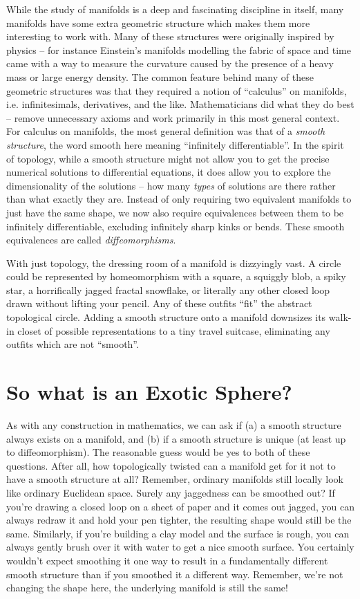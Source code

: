 While the study of manifolds is a deep and fascinating discipline in itself, many manifolds have some extra geometric structure which makes them more interesting to work with. Many of these structures were originally inspired by physics -- for instance Einstein's manifolds modelling the fabric of space and time came with a way to measure the curvature caused by the presence of a heavy mass or large energy density.
The common feature behind many of these geometric structures was that they required a notion of ``calculus'' on manifolds, i.e. infinitesimals, derivatives, and the like. Mathematicians did what they do best -- remove unnecessary axioms and work primarily in this most general context. For calculus on manifolds, the most general definition was that of a \emph{smooth structure}, the word smooth here meaning ``infinitely differentiable''. In the spirit of topology, while a smooth structure might not allow you to get the precise numerical solutions to differential equations, it does allow you to explore the dimensionality of the solutions -- how many \emph{types} of solutions are there rather than what exactly they are. Instead of only requiring two equivalent manifolds to just have the same shape, we now also require equivalences between them to be infinitely differentiable, excluding infinitely sharp kinks or bends. These smooth equivalences are called \emph{diffeomorphisms}.

With just topology, the dressing room of a manifold is dizzyingly vast.
A circle could be represented by homeomorphism with a square, a squiggly blob, a spiky star, a horrifically jagged fractal snowflake, or literally any other closed loop drawn without lifting your pencil. Any of these outfits ``fit'' the abstract topological circle.
Adding a smooth structure onto a manifold downsizes its walk-in closet of possible representations to a tiny travel suitcase, eliminating any outfits which are not ``smooth''.

\section*{So what is an Exotic Sphere?}

As with any construction in mathematics, we can ask if (a) a smooth structure always exists on a manifold, and (b) if a smooth structure is unique (at least up to diffeomorphism). The reasonable guess would be yes to both of these questions. After all, how topologically twisted can a manifold get for it not to have a smooth structure at all? Remember, ordinary manifolds still locally look like ordinary Euclidean space. Surely any jaggedness can be smoothed out? If you're drawing a closed loop on a sheet of paper and it comes out jagged, you can always redraw it and hold your pen tighter, the resulting shape would still be the same. Similarly, if you're building a clay model and the surface is rough, you can always gently brush over it with water to get a nice smooth surface. You certainly wouldn't expect smoothing it one way to result in a fundamentally different smooth structure than if you smoothed it a different way. Remember, we're not changing the shape here, the underlying manifold is still the same!

